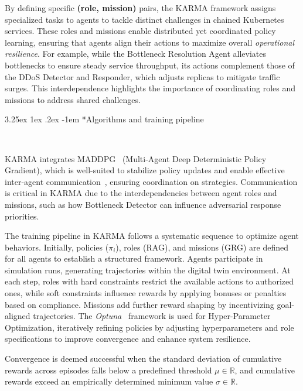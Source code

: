 \documentclass[conference]{IEEEtran}
\makeatletter
\renewcommand\paragraph{\@startsection{paragraph}{5}{\z@}%
  {3.25ex \@plus1ex \@minus.2ex}%
  {-1em}%
  {\normalfont\normalsize\bfseries}}
\makeatother
\begin{document}
By defining specific \textbf{(role, mission)} pairs, the KARMA framework assigns specialized tasks to agents to tackle distinct challenges in chained Kubernetes services. These roles and missions enable distributed yet coordinated policy learning, ensuring that agents align their actions to maximize overall \textit{operational resilience}. For example, while the Bottleneck Resolution Agent alleviates bottlenecks to ensure steady service throughput, its actions complement those of the DDoS Detector and Responder, which adjusts replicas to mitigate traffic surges. This interdependence highlights the importance of coordinating roles and missions to address shared challenges.

\paragraph*{Algorithms and training pipeline}

\

KARMA integrates MADDPG~\cite{Lowe2017MADDPG} (Multi-Agent Deep Deterministic Policy Gradient), which is well-suited to stabilize policy updates and enable effective inter-agent communication~\cite{Lowe2017MADDPG}, ensuring coordination on strategies. Communication is critical in KARMA due to the interdependencies between agent roles and missions, such as how Bottleneck Detector can influence adversarial response priorities.

The training pipeline in KARMA follows a systematic sequence to optimize agent behaviors. Initially, policies (\(\pi_i\)), roles (RAG), and missions (GRG) are defined for all agents to establish a structured framework. Agents participate in simulation runs, generating trajectories within the digital twin environment. At each step, roles with hard constraints restrict the available actions to authorized ones, while soft constraints influence rewards by applying bonuses or penalties based on compliance. Missions add further reward shaping by incentivizing goal-aligned trajectories. The \textit{Optuna}~\cite{akiba2019optuna} framework is used for Hyper-Parameter Optimization, iteratively refining policies by adjusting hyperparameters and role specifications to improve convergence and enhance system resilience.

Convergence is deemed successful when the standard deviation of cumulative rewards across episodes falls below a predefined threshold $\mu \in \mathbb{R}$, and cumulative rewards exceed an empirically determined minimum value $\sigma \in \mathbb{R}$.
\end{document}
